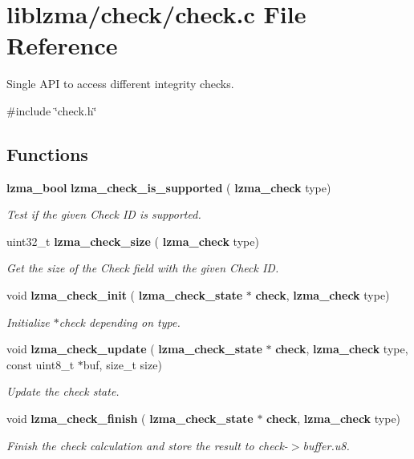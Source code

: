 \section{liblzma/check/check.c File Reference}
\label{check_8c}


Single A\+PI to access different integrity checks.  


{\ttfamily \#include \char`\"{}check.\+h\char`\"{}}\newline
\subsection*{Functions}
\begin{DoxyCompactItemize}
\item 
\textbf{ lzma\+\_\+bool} \textbf{ lzma\+\_\+check\+\_\+is\+\_\+supported} (\textbf{ lzma\+\_\+check} type)
\begin{DoxyCompactList}\small\item\em Test if the given Check ID is supported. \end{DoxyCompactList}\item 
uint32\+\_\+t \textbf{ lzma\+\_\+check\+\_\+size} (\textbf{ lzma\+\_\+check} type)
\begin{DoxyCompactList}\small\item\em Get the size of the Check field with the given Check ID. \end{DoxyCompactList}\item 
void \textbf{ lzma\+\_\+check\+\_\+init} (\textbf{ lzma\+\_\+check\+\_\+state} $\ast$\textbf{ check}, \textbf{ lzma\+\_\+check} type)
\begin{DoxyCompactList}\small\item\em Initialize $\ast$check depending on type. \end{DoxyCompactList}\item 
void \textbf{ lzma\+\_\+check\+\_\+update} (\textbf{ lzma\+\_\+check\+\_\+state} $\ast$\textbf{ check}, \textbf{ lzma\+\_\+check} type, const uint8\+\_\+t $\ast$buf, size\+\_\+t size)
\begin{DoxyCompactList}\small\item\em Update the check state. \end{DoxyCompactList}\item 
void \textbf{ lzma\+\_\+check\+\_\+finish} (\textbf{ lzma\+\_\+check\+\_\+state} $\ast$\textbf{ check}, \textbf{ lzma\+\_\+check} type)
\begin{DoxyCompactList}\small\item\em Finish the check calculation and store the result to check-\/$>$buffer.\+u8. \end{DoxyCompactList}\end{DoxyCompactItemize}


